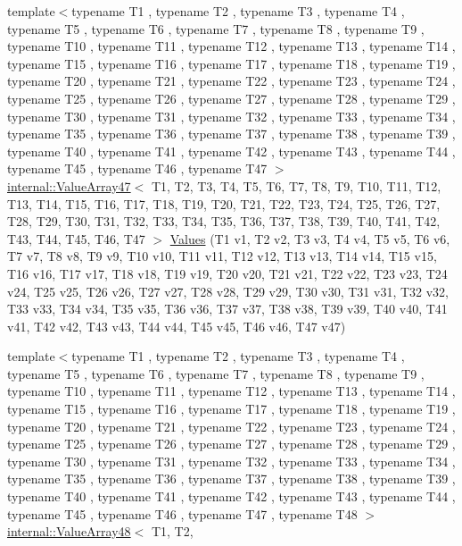 \begin{DoxyCompactItemize}
\item 
{\footnotesize template$<$typename T1 , typename T2 , typename T3 , typename T4 , typename T5 , typename T6 , typename T7 , typename T8 , typename T9 , typename T10 , typename T11 , typename T12 , typename T13 , typename T14 , typename T15 , typename T16 , typename T17 , typename T18 , typename T19 , typename T20 , typename T21 , typename T22 , typename T23 , typename T24 , typename T25 , typename T26 , typename T27 , typename T28 , typename T29 , typename T30 , typename T31 , typename T32 , typename T33 , typename T34 , typename T35 , typename T36 , typename T37 , typename T38 , typename T39 , typename T40 , typename T41 , typename T42 , typename T43 , typename T44 , typename T45 , typename T46 , typename T47 $>$ }\\\hyperlink{classtesting_1_1internal_1_1ValueArray47}{internal\-::\-Value\-Array47}$<$ \-T1, \-T2, \*
\-T3, \-T4, \-T5, \-T6, \-T7, \-T8, \-T9, \*
\-T10, \-T11, \-T12, \-T13, \-T14, \-T15, \*
\-T16, \-T17, \-T18, \-T19, \-T20, \-T21, \*
\-T22, \-T23, \-T24, \-T25, \-T26, \-T27, \*
\-T28, \-T29, \-T30, \-T31, \-T32, \-T33, \*
\-T34, \-T35, \-T36, \-T37, \-T38, \-T39, \*
\-T40, \-T41, \-T42, \-T43, \-T44, \-T45, \*
\-T46, \-T47 $>$ \hyperlink{namespacetesting_aba2697b2cd3e9d667ab3807022303240}{\-Values} (\-T1 v1, \-T2 v2, \-T3 v3, \-T4 v4, \-T5 v5, \-T6 v6, \-T7 v7, \-T8 v8, \-T9 v9, \-T10 v10, \-T11 v11, \-T12 v12, \-T13 v13, \-T14 v14, \-T15 v15, \-T16 v16, \-T17 v17, \-T18 v18, \-T19 v19, \-T20 v20, \-T21 v21, \-T22 v22, \-T23 v23, \-T24 v24, \-T25 v25, \-T26 v26, \-T27 v27, \-T28 v28, \-T29 v29, \-T30 v30, \-T31 v31, \-T32 v32, \-T33 v33, \-T34 v34, \-T35 v35, \-T36 v36, \-T37 v37, \-T38 v38, \-T39 v39, \-T40 v40, \-T41 v41, \-T42 v42, \-T43 v43, \-T44 v44, \-T45 v45, \-T46 v46, \-T47 v47)
\item 
{\footnotesize template$<$typename T1 , typename T2 , typename T3 , typename T4 , typename T5 , typename T6 , typename T7 , typename T8 , typename T9 , typename T10 , typename T11 , typename T12 , typename T13 , typename T14 , typename T15 , typename T16 , typename T17 , typename T18 , typename T19 , typename T20 , typename T21 , typename T22 , typename T23 , typename T24 , typename T25 , typename T26 , typename T27 , typename T28 , typename T29 , typename T30 , typename T31 , typename T32 , typename T33 , typename T34 , typename T35 , typename T36 , typename T37 , typename T38 , typename T39 , typename T40 , typename T41 , typename T42 , typename T43 , typename T44 , typename T45 , typename T46 , typename T47 , typename T48 $>$ }\\\hyperlink{classtesting_1_1internal_1_1ValueArray48}{internal\-::\-Value\-Array48}$<$ \-T1, \-T2, \*

\end{DoxyCompactItemize}
